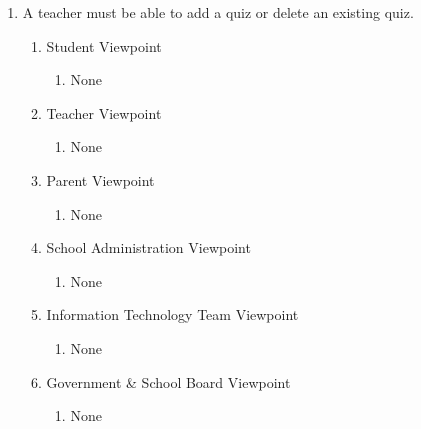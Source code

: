 \documentclass[]{article}
\begin{document}
\begin{enumerate}[{BE}1.]
	\item A teacher must be able to add a quiz or delete an existing quiz.
	\begin{enumerate}[{VP2}.1]
		\item Student Viewpoint
			\begin{enumerate}
				\item None
			\end{enumerate}
		\item Teacher Viewpoint
			\begin{enumerate}
				\item None
			\end{enumerate}
		\item Parent Viewpoint
			\begin{enumerate}
				\item None
			\end{enumerate}
		\item School Administration Viewpoint
			\begin{enumerate}
				\item None
			\end{enumerate}
		\item Information Technology Team Viewpoint
			\begin{enumerate}
				\item None
			\end{enumerate}
		\item Government \& School Board Viewpoint
			\begin{enumerate}
				\item None
			\end{enumerate}
	\end{enumerate}


\end{enumerate}
\end{document}
